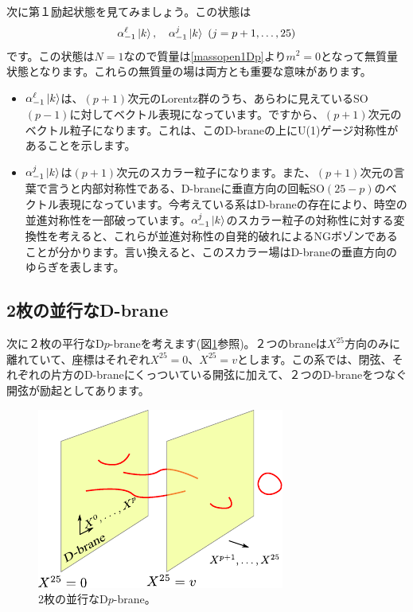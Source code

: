 \documentclass[report,paper=a4, fontsize=12pt, line_length=16cm, number_of_lines=34,dvipdfmx]{jlreq}
\numberwithin{equation}{chapter}
\numberwithin{equation}{section}
\begin{document}
次に第１励起状態を見てみましょう。この状態は
\begin{align}
  \alpha_{-1}^{\ell}\ket{k},\quad 
  \alpha_{-1}^{j}\ket{k}\ (j=p+1,\dots,25)
\end{align}
です。この状態は$N=1$なので質量は\eqref{massopen1Dp}より$m^2=0$となって無質量状態となります。これらの無質量の場は両方とも重要な意味があります。
\begin{itemize}
  \item $\alpha_{-1}^{\ell}\ket{k}$は、$(p+1)$次元のLorentz群のうち、あらわに見えているSO$(p-1)$に対してベクトル表現になっています。ですから、$(p+1)$次元のベクトル粒子になります。これは、このD-braneの上にU(1)ゲージ対称性があることを示します。
  \item $\alpha_{-1}^{j}\ket{k}$は$(p+1)$次元のスカラー粒子になります。また、$(p+1)$次元の言葉で言うと内部対称性である、D-braneに垂直方向の回転SO$(25-p)$のベクトル表現になっています。今考えている系はD-braneの存在により、時空の並進対称性を一部破っています。$\alpha_{-1}^{j}\ket{k}$のスカラー粒子の対称性に対する変換性を考えると、これらが並進対称性の自発的破れによるNGボゾンであることが分かります。言い換えると、このスカラー場はD-braneの垂直方向のゆらぎを表します。
\end{itemize}

\subsection{2枚の並行なD-brane}
次に２枚の平行なD$p$-braneを考えます(図\ref{fig:parallelbrane}参照)。２つのbraneは$X^{25}$方向のみに離れていて、座標はそれぞれ$X^{25}=0$、$X^{25}=v$とします。この系では、閉弦、それぞれの片方のD-braneにくっついている開弦に加えて、２つのD-braneをつなぐ開弦が励起としてあります。
\begin{figure}
  \centering
  \includegraphics[scale=1.5]{parallelbrane.pdf}
  \caption{2枚の並行なD$p$-brane。}
  \label{fig:parallelbrane}
\end{figure}
\end{document}
